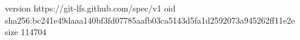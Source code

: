 version https://git-lfs.github.com/spec/v1
oid sha256:bc241e49daaa140bf3fd07785aafb03ca5143d5fa1d2592073a945262ff11e2e
size 114704
